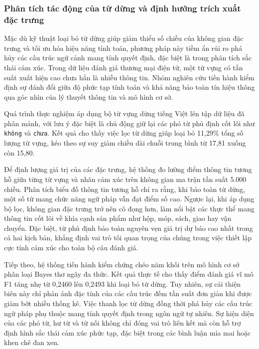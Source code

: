 \subsubsection{Phân tích tác động của từ dừng và định hướng trích xuất đặc trưng}

Mặc dù kỹ thuật loại bỏ từ dừng giúp giảm thiểu số chiều của không gian đặc trưng và tối ưu hóa hiệu năng tính toán, phương pháp này tiềm ẩn rủi ro phá hủy các cấu trúc ngữ cảnh mang tính quyết định, đặc biệt là trong phân tích sắc thái cảm xúc. Trong dữ liệu đánh giá thương mại điện tử, một từ vựng có tần suất xuất hiện cao chưa hẳn là nhiễu thông tin. Nhóm nghiên cứu tiến hành kiểm định sự đánh đổi giữa độ phức tạp tính toán và khả năng bảo toàn tín hiệu thông qua góc nhìn của lý thuyết thông tin và mô hình cơ sở.

Quá trình thực nghiệm áp dụng bộ từ vựng dừng tiếng Việt lên tập dữ liệu đã phân mảnh, với lưu ý đặc biệt là chủ động giữ lại các phó từ phủ định cốt lõi như \texttt{không} và \texttt{chưa}. Kết quả cho thấy việc lọc từ dừng giúp loại bỏ 11,29\% tổng số lượng từ vựng, kéo theo sự suy giảm chiều dài chuỗi trung bình từ 17,81 xuống còn 15,80.

Để định lượng giá trị của các đặc trưng, hệ thống đo lường điểm thông tin tương hỗ giữa từng từ vựng và nhãn cảm xúc trên không gian ma trận tần suất 5.000 chiều. Phân tích biểu đồ thông tin tương hỗ chỉ ra rằng, khi bảo toàn từ dừng, một số từ mang chức năng ngữ pháp vẫn đạt điểm số cao. Ngược lại, khi áp dụng bộ lọc, không gian đặc trưng trở nên cô đọng hơn, làm nổi bật các thực thể mang thông tin cốt lõi về khía cạnh sản phẩm như hộp, móp, sách, giao hay vận chuyển. Đặc biệt, từ phủ định bảo toàn nguyên vẹn giá trị dự báo cao nhất trong cả hai kịch bản, khẳng định vai trò tối quan trọng của chúng trong việc thiết lập cực tính cảm xúc cho toàn bộ câu đánh giá.

Tiếp theo, hệ thống tiến hành kiểm chứng chéo năm khối trên mô hình cơ sở phân loại Bayes thơ ngây đa thức. Kết quả thực tế cho thấy điểm đánh giá vĩ mô F1 tăng nhẹ từ 0,2460 lên 0,2493 khi loại bỏ từ dừng. Tuy nhiên, sự cải thiện biên này chỉ phản ánh đặc tính của các cấu trúc đếm tần suất đơn giản khi được giảm bớt nhiễu thống kê. Việc thanh lọc từ dừng đồng thời phá hủy các cấu trúc ngữ pháp phụ thuộc mang tính quyết định trong ngôn ngữ tự nhiên. Sự hiện diện của các phó từ, hư từ và từ nối không chỉ đóng vai trò liên kết mà còn hỗ trợ định hình sắc thái cảm xúc phức tạp, đặc biệt trong các bình luận mỉa mai hoặc khen chê đan xen.

